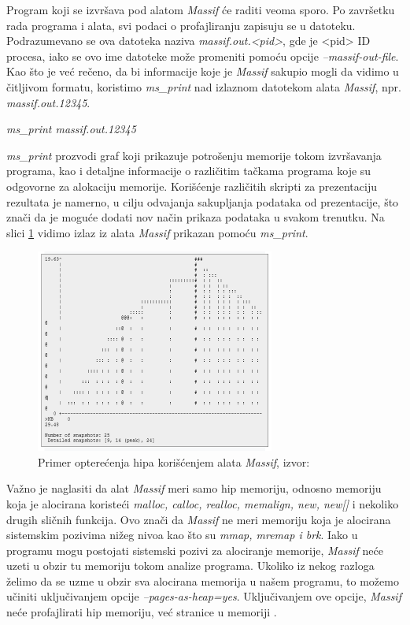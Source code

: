 \documentclass[12pt,oneside]{memoir}
\theoremstyle{plain}
\theoremstyle{definition}
\begin{document}
Program koji se izvršava pod alatom \textit{Massif} će raditi veoma sporo. Po završetku rada programa i alata, svi podaci o profajliranju zapisuju se u datoteku. Podrazumevano se ova datoteka naziva \textit{massif.out.<pid>}, gde je <pid> ID procesa, iako se ovo ime datoteke može promeniti pomoću opcije \textit{--massif-out-file}. Kao što je već rečeno, da bi informacije koje je \textit{Massif} sakupio mogli da vidimo u čitljivom formatu, koristimo \textit{ms\_print} nad izlaznom datotekom alata \textit{Massif}, npr. \textit{massif.out.12345}.

\begin{center}
\textit{ms\_print massif.out.12345}
\end{center}

\textit{ms\_print} prozvodi graf koji prikazuje potrošenju memorije tokom izvršavanja programa, kao i detaljne informacije o različitim tačkama programa koje su odgovorne za alokaciju memorije. Korišćenje različitih skripti za prezentaciju rezultata je namerno, u cilju odvajanja sakupljanja podataka od prezentacije, što znači da je moguće dodati nov način prikaza podataka u svakom trenutku. Na slici \ref{fig:slika2.23} vidimo izlaz iz alata \textit{Massif} prikazan pomoću \textit{ms\_print}.
\begin{figure}[!ht]
  \centering
  \includegraphics[width=0.7\textwidth]{MassifPhoto.png}
  \caption{Primer opterećenja hipa korišćenjem alata \textit{Massif}, izvor: \cite{Massif}}
  \label{fig:slika2.23}
\end{figure}

Važno je naglasiti da alat \textit{Massif} meri samo hip memoriju, odnosno memoriju koja je alocirana koristeći \textit{malloc, calloc, realloc, memalign, new, new[]} i nekoliko drugih sličnih funkcija. Ovo znači da \textit{Massif} ne meri memoriju koja je alocirana sistemskim pozivima nižeg nivoa kao što su \textit{mmap, mremap i brk}. Iako  u programu mogu postojati sistemski pozivi za alociranje memorije, \textit{Massif} neće uzeti u obzir tu memoriju tokom analize programa. Ukoliko iz nekog razloga želimo da se uzme u  obzir sva alocirana memorija u našem programu, to možemo učiniti uključivanjem opcije \textit{--pages-as-heap=yes}. Uključivanjem ove opcije, \textit{Massif} neće profajlirati hip memoriju, već stranice u memoriji \cite{Massif}. 
\end{document}
